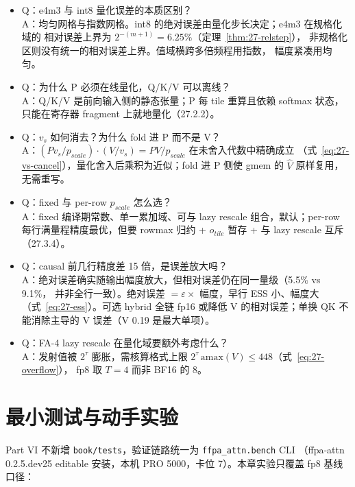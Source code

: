 \begin{itemize}[itemsep=1pt,topsep=2pt]
  \item Q：e4m3 与 int8 量化误差的本质区别？\\
        A：均匀网格与指数网格。int8 的绝对误差由量化步长决定；e4m3 在规格化域的
        相对误差上界为 $2^{-(m+1)}=6.25\%$（定理~\ref{thm:27-relstep}），
        非规格化区则没有统一的相对误差上界。值域横跨多倍频程用指数，
        幅度紧凑用均匀。
  \item Q：为什么 P 必须在线量化，Q/K/V 可以离线？\\
        A：Q/K/V 是前向输入侧的静态张量；P 每 tile 重算且依赖 softmax 状态，
        只能在寄存器 fragment 上就地量化（27.2.2）。
  \item Q：$v_s$ 如何消去？为什么 fold 进 P 而不是 V？\\
        A：$(P v_s / p_{scale}) \cdot (V / v_s) = PV / p_{scale}$ 在未舍入代数中精确成立
        （式~\ref{eq:27-vs-cancel}），量化舍入后乘积为近似；fold 进 P 侧使 gmem 的
        $\hat V$ 原样复用，无需重写。
  \item Q：fixed 与 per-row $p_{scale}$ 怎么选？\\
        A：fixed 编译期常数、单一累加域、可与 lazy rescale 组合，默认；per-row
        每行满量程精度最优，但要 rowmax 归约 + $o_{tile}$ 暂存 + 与 lazy rescale
        互斥（27.3.4）。
  \item Q：causal 前几行精度差 15 倍，是误差放大吗？\\
        A：绝对误差确实随输出幅度放大，但相对误差仍在同一量级（5.5\% vs 9.1\%，
        并非全行一致）。绝对误差 $= \varepsilon \times$ 幅度，早行 ESS 小、幅度大
        （式~\ref{eq:27-ess}）。可选 hybrid 全链 fp16 或降低 V 的相对误差；单换 QK
        不能消除主导的 V 误差（V 0.19 是最大单项）。
  \item Q：FA-4 lazy rescale 在量化域要额外考虑什么？\\
        A：发射值被 $2^{\tau}$ 膨胀，需核算格式上限
        $2^{\tau}\,\mathrm{amax}(V) \le 448$（式~\ref{eq:27-overflow}），
        fp8 取 $T{=}4$ 而非 BF16 的 8。
\end{itemize}

\section{最小测试与动手实验}

Part VI 不新增 \texttt{book/tests}，验证链路统一为 \texttt{ffpa\_attn.bench} CLI
（ffpa-attn 0.2.5.dev25 editable 安装，本机 PRO 5000，卡位 7）。本章实验只覆盖
fp8 基线口径：

